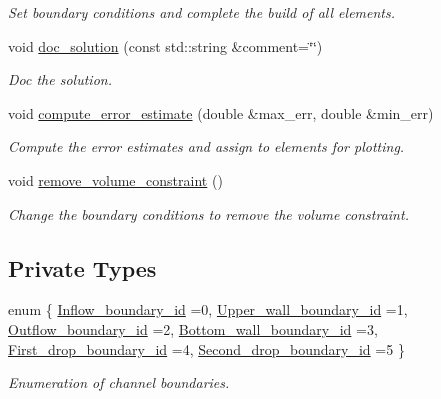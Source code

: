 \begin{DoxyCompactItemize}
\begin{DoxyCompactList}\small\item\em Set boundary conditions and complete the build of all elements. \end{DoxyCompactList}\item 
void \hyperlink{classDropInChannelProblem_a3bcebc0cd731b75db441f3e1d62296ae}{doc\+\_\+solution} (const std\+::string \&comment=\char`\"{}\char`\"{})
\begin{DoxyCompactList}\small\item\em Doc the solution. \end{DoxyCompactList}\item 
void \hyperlink{classDropInChannelProblem_a49944969eb8dc6892cab3f1a9a2cb382}{compute\+\_\+error\+\_\+estimate} (double \&max\+\_\+err, double \&min\+\_\+err)
\begin{DoxyCompactList}\small\item\em Compute the error estimates and assign to elements for plotting. \end{DoxyCompactList}\item 
void \hyperlink{classDropInChannelProblem_ab8a7491ab12974ccc4cc10bfc0f20675}{remove\+\_\+volume\+\_\+constraint} ()
\begin{DoxyCompactList}\small\item\em Change the boundary conditions to remove the volume constraint. \end{DoxyCompactList}\end{DoxyCompactItemize}
\subsection*{Private Types}
\begin{DoxyCompactItemize}
\item 
enum \{ \newline
\hyperlink{classDropInChannelProblem_a334e4cdb720696ffbc70724caf9b6daba024ca7e6fdbb8bb0dee2984ad4fced0f}{Inflow\+\_\+boundary\+\_\+id} =0, 
\hyperlink{classDropInChannelProblem_a334e4cdb720696ffbc70724caf9b6daba8ce939185dbf37b1b305415c8c73c49c}{Upper\+\_\+wall\+\_\+boundary\+\_\+id} =1, 
\hyperlink{classDropInChannelProblem_a334e4cdb720696ffbc70724caf9b6daba760529dba266f41a831817920ccb1873}{Outflow\+\_\+boundary\+\_\+id} =2, 
\hyperlink{classDropInChannelProblem_a334e4cdb720696ffbc70724caf9b6daba2eb65a21fcbe1b5fe6df3e39edfc3ad7}{Bottom\+\_\+wall\+\_\+boundary\+\_\+id} =3, 
\newline
\hyperlink{classDropInChannelProblem_a334e4cdb720696ffbc70724caf9b6daba7302dcf9298cbc359783e0bc10832a1a}{First\+\_\+drop\+\_\+boundary\+\_\+id} =4, 
\hyperlink{classDropInChannelProblem_a334e4cdb720696ffbc70724caf9b6dababf5c99f82e00ae63a827d4aef8c9d918}{Second\+\_\+drop\+\_\+boundary\+\_\+id} =5
 \}\begin{DoxyCompactList}\small\item\em Enumeration of channel boundaries. \end{DoxyCompactList}
\end{DoxyCompactItemize}
